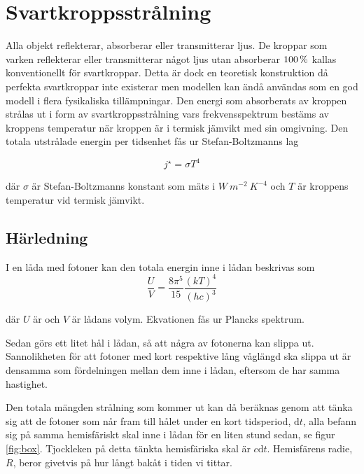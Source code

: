 \section{Svartkroppsstrålning}
\label{sec:blackbody}

Alla objekt reflekterar, absorberar eller transmitterar ljus. De kroppar som varken 
reflekterar eller transmitterar något ljus utan absorberar $\unit[100]{\%}$ kallas konventionellt för svartkroppar. Detta är dock en teoretisk konstruktion då perfekta svartkroppar inte existerar men modellen kan ändå användas som en god modell i flera fysikaliska 
tillämpningar. Den energi som absorberats av kroppen strålas ut i form av svartkroppsstrålning vars 
frekvensspektrum bestäms av kroppens temperatur när kroppen är i termisk jämvikt med
 sin omgivning. Den totala utstrålade energin per tidsenhet fås ur Stefan-Boltzmanns lag
 
\begin{equation}
\label{eq:boltzmanslag}
\boxed{ \; \; \;
j^{\star} = \sigma T^{4}
\; \; \; }
\end{equation}

\noindent
där $\sigma$ är Stefan-Boltzmanns konstant som mäts i $\unit{W~m^{-2}~K^{-4}}$ och $T$ är kroppens temperatur vid termisk jämvikt.

\subsection{Härledning}
I en låda med fotoner kan den totala energin inne i lådan beskrivas som 
\begin{equation}
\label{eq:photonbox}
\frac{U}{V}=\frac{8\pi^5}{15}\frac{(kT)^4}{(hc)^3}
\end{equation}

där $U$ är  och $V$ är lådans volym. Ekvationen fås ur Plancks spektrum.\cite[ss.~301-302]{schroeder00} %

Sedan görs ett litet hål i lådan, så att några av fotonerna kan slippa ut. Sannolikheten för att fotoner med kort respektive lång våglängd ska slippa ut är densamma som fördelningen mellan dem inne i lådan, eftersom de har samma hastighet.

Den totala mängden strålning som kommer ut kan då beräknas genom att tänka sig att 
de fotoner som når fram till hålet under en kort tidsperiod, $\mathrm{d}t$, alla befann sig
 på samma hemisfäriskt skal inne i lådan för en liten stund sedan, se figur \ref{fig:box}. Tjockleken på detta tänkta hemisfäriska skal är $c\mathrm{d}t$. Hemisfärens radie, $R$, beror givetvis på hur långt bakåt i tiden vi tittar.

